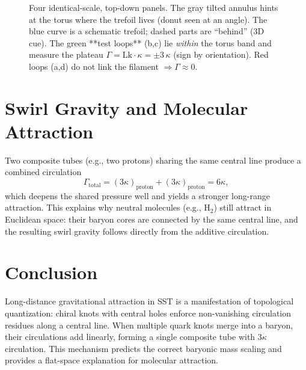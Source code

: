 \documentclass[reprint,aps,onecolumn,nofootinbib]{revtex4-2}
\begin{document}
\begin{figure}[t]
{%
}

\hspace{0.9cm}
\hspace{0.9cm}
\hspace{0.9cm}

\caption{Four identical-scale, top-down panels. The gray tilted annulus hints at the torus where the trefoil lives (donut seen at an angle).
The blue curve is a schematic trefoil; dashed parts are “behind” (3D cue).
The green **test loops** (b,c) lie \emph{within} the torus band and measure the plateau \(\Gamma=\mathrm{Lk}\cdot\kappa=\pm 3\,\kappa\) (sign by orientation).
Red loops (a,d) do not link the filament \(\Rightarrow \Gamma\approx 0\).}
\label{fig:fourpanel-3D-cartoon}
\end{figure}


\section{Swirl Gravity and Molecular Attraction}
Two composite tubes (e.g., two protons) sharing the same central line produce a combined circulation
\[
    \Gamma_{\mathrm{total}} = (3 \kappa)_{\mathrm{proton}} + (3 \kappa)_{\mathrm{proton}} = 6 \kappa,
\]
which deepens the shared pressure well and yields a stronger long-range attraction.
This explains why neutral molecules (e.g., H$_2$) still attract in Euclidean space: their baryon cores are connected by the same central line, and the resulting swirl gravity follows directly from the additive circulation.

\section{Conclusion}
Long-distance gravitational attraction in SST is a manifestation of topological quantization: chiral knots with central holes enforce non-vanishing circulation residues along a central line.
When multiple quark knots merge into a baryon, their circulations add linearly, forming a single composite tube with $3\kappa$ circulation.
This mechanism predicts the correct baryonic mass scaling and provides a flat-space explanation for molecular attraction.



\nocite{*}


\end{document}
